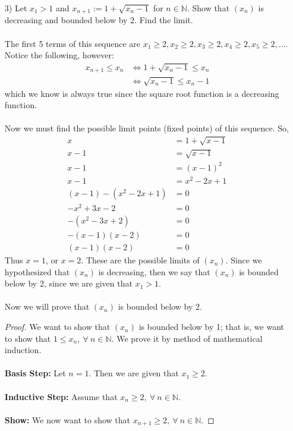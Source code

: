 \documentclass[12pt,letterpaper]{article}
\newcommand{\N}{\mathbb{N}}
\theoremstyle{case}
\theoremstyle{definition}
\begin{document}
\begin{enumerate}
\begin{enumerate}
\begin{enumerate}
			\item[3)] Let $x_1 > 1$ and $x_{n+1} := 1 + \sqrt{x_n - 1}$ for $n \in \N$. Show that $(x_n)$ is decreasing and bounded below by $2$. Find the limit.
			\\\\The first 5 terms of this sequence are $x_1 \geq 2, x_2 \geq 2, x_3 \geq 2, x_4 \geq 2, x_5 \geq 2, \dots$. Notice the following, however:
			\begin{align*}
				x_{n+1} \leq x_n &\iff 1+\sqrt{x_n - 1} \leq x_n \\
				&\iff \sqrt{x_n -1} \leq x_n -1
			\end{align*}
			which we know is always true since the square root function is a decreasing function.
			\\\\Now we must find the possible limit points (fixed points) of this sequence. So,
			\begin{align*}
				x &= 1 + \sqrt{x-1} \\
				x-1 &= \sqrt{x-1} \\
				x-1 &= (x-1)^2 \\
				x-1 &= x^2 -2x +1 \\
				(x-1)-(x^2-2x+1) &= 0 \\
				-x^2+3x-2 &=0 \\
				-(x^2-3x+2) &= 0 \\
				-(x-1)(x-2) &= 0 \\
				(x-1)(x-2) &= 0
			\end{align*}
			Thus $x=1$, or $x=2$. These are the possible limits of $(x_n)$. Since we hypothesized that $(x_n)$ is decreasing, then we say that $(x_n)$ is bounded below by 2, since we are given that $x_1 > 1$.
			\\\\Now we will prove that $(x_n)$ is bounded below by 2.\\
			\begin{proof}
				We want to show that $(x_n)$ is bounded below by 1; that is, we want to show that $1 \leq x_n,\ \forall\ n \in \N$. We prove it by method of mathematical induction.
				\\\\\textbf{Basis Step:} Let $n=1$. Then we are given that $x_1 \geq 2$.
				\\\\\textbf{Inductive Step:} Assume that $x_n \geq 2,\ \forall\ n \in \N$.
				\\\\\textbf{Show:} We now want to show that $x_{n+1} \geq 2,\ \forall\ n \in \N$.

\end{proof}
\end{enumerate}
\end{enumerate}
\end{enumerate}
\end{document}
